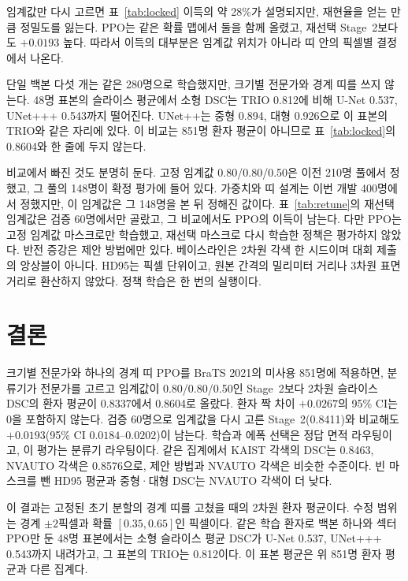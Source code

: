 \documentclass[runningheads]{llncs}
\begin{document}
임계값만 다시 고르면 표~\ref{tab:locked} 이득의 약 28\%가 설명되지만, 재현율을 얻는 만큼 정밀도를 잃는다. PPO는 같은 확률 맵에서 둘을 함께 올렸고, 재선택 Stage~2보다도 $+0.0193$ 높다. 따라서 이득의 대부분은 임계값 위치가 아니라 띠 안의 픽셀별 결정에서 나온다.

단일 백본 다섯 개는 같은 280명으로 학습했지만, 크기별 전문가와 경계 띠를 쓰지 않는다. 48명 표본의 슬라이스 평균에서 소형 DSC는 TRIO 0.812에 비해 U-Net 0.537, UNet+++ 0.543까지 떨어진다. UNet++는 중형 0.894, 대형 0.926으로 이 표본의 TRIO와 같은 자리에 있다. 이 비교는 851명 환자 평균이 아니므로 표~\ref{tab:locked}의 0.8604와 한 줄에 두지 않는다.

비교에서 빠진 것도 분명히 둔다. 고정 임계값 0.80/0.80/0.50은 이전 210명 풀에서 정했고, 그 풀의 148명이 확정 평가에 들어 있다. 가중치와 띠 설계는 이번 개발 400명에서 정했지만, 이 임계값은 그 148명을 본 뒤 정해진 값이다. 표~\ref{tab:retune}의 재선택 임계값은 검증 60명에서만 골랐고, 그 비교에서도 PPO의 이득이 남는다. 다만 PPO는 고정 임계값 마스크로만 학습했고, 재선택 마스크로 다시 학습한 정책은 평가하지 않았다. 반전 증강은 제안 방법에만 있다. 베이스라인은 2차원 각색 한 시드이며 대회 제출의 앙상블이 아니다. HD95는 픽셀 단위이고, 원본 간격의 밀리미터 거리나 3차원 표면 거리로 환산하지 않았다. 정책 학습은 한 번의 실행이다.

\section{결론}

크기별 전문가와 하나의 경계 띠 PPO를 BraTS 2021의 미사용 851명에 적용하면, 분류기가 전문가를 고르고 임계값이 0.80/0.80/0.50인 Stage~2보다 2차원 슬라이스 DSC의 환자 평균이 0.8337에서 0.8604로 올랐다. 환자 짝 차이 $+0.0267$의 95\% CI는 0을 포함하지 않는다. 검증 60명으로 임계값을 다시 고른 Stage~2(0.8411)와 비교해도 $+0.0193$(95\% CI $0.0184$--$0.0202$)이 남는다. 학습과 에폭 선택은 정답 면적 라우팅이고, 이 평가는 분류기 라우팅이다. 같은 집계에서 KAIST 각색의 DSC는 0.8463, NVAUTO 각색은 0.8576으로, 제안 방법과 NVAUTO 각색은 비슷한 수준이다. 빈 마스크를 뺀 HD95 평균과 중형·대형 DSC는 NVAUTO 각색이 더 낮다.

이 결과는 고정된 초기 분할의 경계 띠를 고쳤을 때의 2차원 환자 평균이다. 수정 범위는 경계 $\pm2$픽셀과 확률 $[0.35,0.65]$인 픽셀이다. 같은 학습 환자로 백본 하나와 섹터 PPO만 둔 48명 표본에서는 소형 슬라이스 평균 DSC가 U-Net 0.537, UNet+++ 0.543까지 내려가고, 그 표본의 TRIO는 0.812이다. 이 표본 평균은 위 851명 환자 평균과 다른 집계다.
\end{document}
